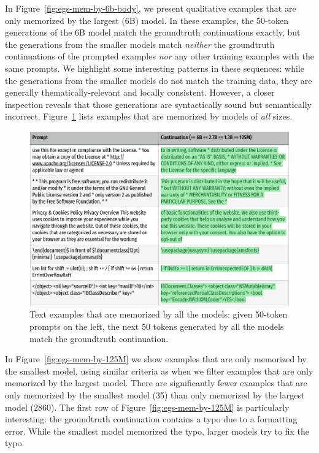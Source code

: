 In Figure~\ref{fig:egs-mem-by-6b-body}, we present qualitative examples that are only memorized by the largest (6B) model.
In these examples, the 50-token generations of the 6B model match the groundtruth continuations exactly, but the generations from the smaller models match \emph{neither} the groundtruth continuations of the prompted examples \emph{nor} any other training examples with the same prompts.
We highlight some interesting patterns in these sequences: while the generations from the smaller models do not match the training data, they are generally thematically-relevant and locally consistent.
However, a closer inspection reveals that those generations are syntactically sound but semantically incorrect.
Figure~\ref{fig:egs-mem-by-all} lists examples that are memorized by models of \emph{all} sizes.

\begin{figure}[h]
    \centering
    \includegraphics[width=.8\linewidth]{figures/text-egs/style2-mem-by-all_pg1.pdf}
    \caption{Text examples that are memorized by all the models: given 50-token prompts on the left, the next 50 tokens generated by all the models match the groundtruth continuation.}
    \label{fig:egs-mem-by-all}
\end{figure}

In Figure~\ref{fig:egs-mem-by-125M} we show examples that are only memorized by the smallest model, using similar criteria as when we filter examples that are only memorized by the largest model. There are significantly fewer examples that are only memorized by the smallest model (35) than only memorized by the largest model (2860).
The first row of Figure~\ref{fig:egs-mem-by-125M} is particularly interesting: the groundtruth continuation contains a typo due to a formatting error.
While the smallest model memorized the typo, larger models try to fix the typo.

